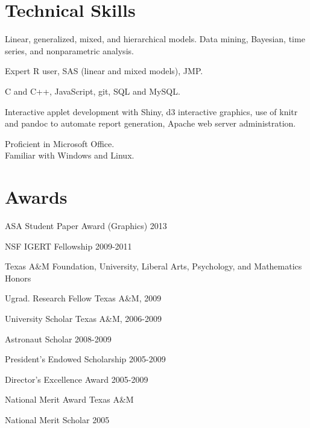 \documentclass[10pt]{tccv}
\begin{document}
\section{Technical Skills}
\begin{description}[leftmargin=*]
\item [Statistical Techniques]
Linear, generalized, mixed, and hierarchical models. Data mining, Bayesian, time series, and nonparametric analysis.\vspace{-6pt}
\item [Statistical Software]
Expert R user, SAS (linear and mixed models), JMP. \vspace{-6pt}
\item [Programming and Database Software]
C and C++, JavaScript, git, SQL and MySQL. \vspace{-6pt}
\item [Web Development]
Interactive applet development with Shiny, d3 interactive graphics, use of knitr and pandoc to automate report generation, Apache web server administration.\vspace{-6pt}
\item [Computer Skills] Proficient in Microsoft Office.\\Familiar with Windows and Linux. 
\end{description}

\section{Awards}
\begin{factlist}[leftmargin=.1cm,itemindent=.1cm,labelwidth=\itemindent,labelsep=.1cm]\itemsep-2pt
\item[ASA Student Paper Award (Graphics)] 2013
\item[NSF IGERT Fellowship] 2009-2011
\item[Texas A\&M] Foundation, University, Liberal Arts, Psychology, and Mathematics Honors
\item[Ugrad. Research Fellow] Texas A\&M, 2009
\item[University Scholar] Texas A\&M, 2006-2009
\item[Astronaut Scholar] 2008-2009
\item[President's Endowed Scholarship] 2005-2009
\item[Director's Excellence Award] 2005-2009
\item[National Merit Award] Texas A\&M
\item[National Merit Scholar] 2005
\end{factlist}
\end{document}
